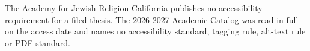 %
%
%
%
%
%
%
%


%
	{The Academy for Jewish Religion California publishes no accessibility
	 requirement for a filed thesis. The 2026-2027 Academic Catalog was read in
	 full on the access date and names no accessibility standard, tagging rule,
	 alt-text rule or PDF standard.}

